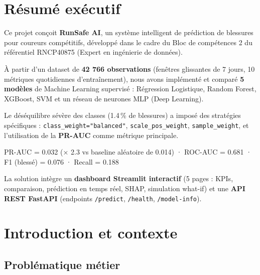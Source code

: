\documentclass[12pt,a4paper]{report}
\begin{document}
\tableofcontents
\newpage

\chapter*{Résumé exécutif}

Ce projet conçoit \textbf{RunSafe AI}, un système intelligent de prédiction de blessures
pour coureurs compétitifs, développé dans le cadre du Bloc de compétences 2 du référentiel
RNCP40875 (Expert en ingénierie de données).

À partir d'un dataset de \textbf{42 766 observations} (fenêtres glissantes de 7 jours,
10 métriques quotidiennes d'entraînement), nous avons implémenté et comparé \textbf{5 modèles}
de Machine Learning supervisé : Régression Logistique, Random Forest, XGBoost, SVM et un
réseau de neurones MLP (Deep Learning).

Le déséquilibre sévère des classes (1.4\,\% de blessures) a imposé des stratégies spécifiques :
\texttt{class\_weight="balanced"}, \texttt{scale\_pos\_weight}, \texttt{sample\_weight},
et l'utilisation de la \textbf{PR-AUC} comme métrique principale.

\begin{resultbox}[title=Modèle recommandé : Random Forest]
PR-AUC = 0.032 (× 2.3 vs baseline aléatoire de 0.014) ·
ROC-AUC = 0.681 · F1 (blessé) = 0.076 · Recall = 0.188
\end{resultbox}

La solution intègre un \textbf{dashboard Streamlit interactif} (5 pages : KPIs, comparaison,
prédiction en temps réel, SHAP, simulation what-if) et une \textbf{API REST FastAPI}
(endpoints \texttt{/predict}, \texttt{/health}, \texttt{/model-info}).

\chapter{Introduction et contexte}

\section{Problématique métier}
\end{document}
